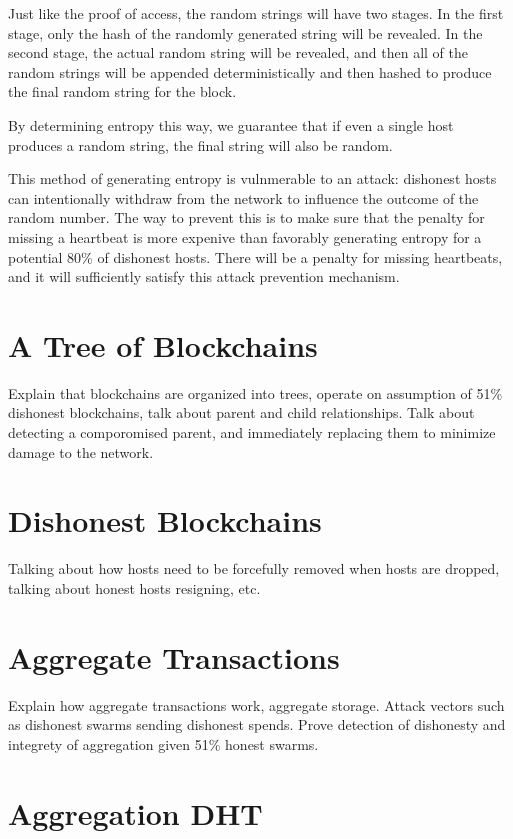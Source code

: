 \documentclass[twocolumn]{article}
\begin{document}
Just like the proof of access, the random strings will have two stages.
In the first stage, only the hash of the randomly generated string will be revealed.
In the second stage, the actual random string will be revealed, and then all of the random strings will be appended deterministically and then hashed to produce the final random string for the block.

By determining entropy this way, we guarantee that if even a single host produces a random string, the final string will also be random.

This method of generating entropy is vulnmerable to an attack: dishonest hosts can intentionally withdraw from the network to influence the outcome of the random number.
The way to prevent this is to make sure that the penalty for missing a heartbeat is more expenive than favorably generating entropy for a potential 80\% of dishonest hosts.
There will be a penalty for missing heartbeats, and it will sufficiently satisfy this attack prevention mechanism.

\section{A Tree of Blockchains}

Explain that blockchains are organized into trees, operate on assumption of 51\% dishonest blockchains, talk about parent and child relationships. Talk about detecting a comporomised parent, and immediately replacing them to minimize damage to the network.

\section{Dishonest Blockchains}

Talking about how hosts need to be forcefully removed when hosts are dropped, talking about honest hosts resigning, etc.

\section{Aggregate Transactions}

Explain how aggregate transactions work, aggregate storage. Attack vectors such as dishonest swarms sending dishonest spends. Prove detection of dishonesty and integrety of aggregation given 51\% honest swarms.

\section{Aggregation DHT}
\end{document}

